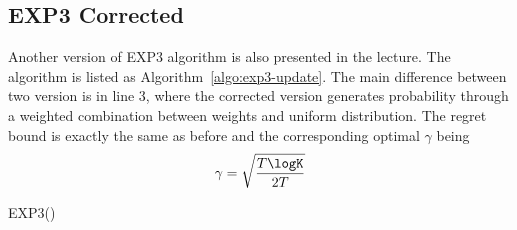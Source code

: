 \documentclass[11pt]{article}
\begin{document}
\subsection{EXP3 Corrected}
Another version of EXP3 algorithm is also presented in the lecture. The algorithm is listed as Algorithm~\ref{algo:exp3-update}. The main difference between two version is in line 3, where the corrected version generates probability through a weighted combination between weights and uniform distribution. The regret bound is exactly the same as before and the corresponding optimal $\gamma$ being
$$\gamma = \sqrt{\frac{T\logK}{2T}}$$
\begin{algorithm}[H]
\caption{EXP3(\gamma \in [0, 1])}
\label{algo:exp3-update}
\begin{algorithmic}[1]
\STATE $\textbf{w}^{(1)}$ \leftarrow $\{w_k^{(1)} = 1 \}_{k=1}^K$ \hfill weights over actions
\STATE $\textbf{p}^{(t)} = (1 -\gamma)\frac{\textbf{w}^{(t)}}{\sum_k w_k^{(t)}} + \frac{\gamma}{K}$ \hfill probability over actions
\STATE k $\sim  \textsc{MULTINOMIAL}(\textbf{p}^{(t)})$ 
\hfill  take and draw action
\STATE $a^{(t)} = a_k$\hfill 
\STATE $\textsc{RECEIVE}(r^{(t)}\in[0, 1])$ \hfill get reward
\STATE $w_k^{(t+1)} = w_k^{(t)}e^{\frac{\gamma}{K} \frac{r^{(t)}}{p_k^{(t)}}$ \hfill update weight

\ENDFOR
\end{algorithmic}
\end{algorithm}
\end{document}
